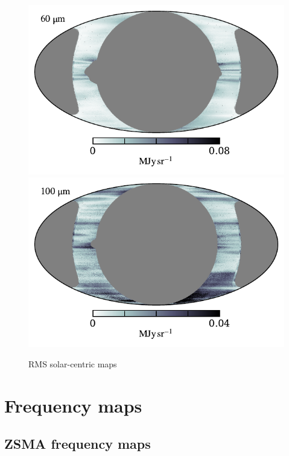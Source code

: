 \documentclass{aa}
\begin{document}
\begin{figure}
  \includegraphics[width=0.83\linewidth]{figs/rms_solar_07.pdf}\\\vspace*{-2mm}
  \includegraphics[width=0.83\linewidth]{figs/rms_solar_08.pdf}
  \caption{RMS solar-centric maps}
  \label{fig:solarmaps_rms}
\end{figure}

       
\clearpage
\section{Frequency maps}
\label{sec:maps}

\subsection{ZSMA frequency maps}
\end{document}
